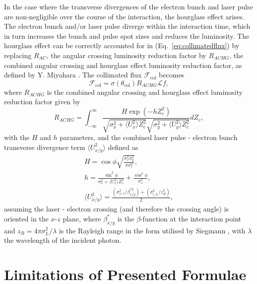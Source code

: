 \documentclass[10pt]{article}
\begin{document}
In the case where the transverse divergences of the electron bunch and laser pulse are non-negligible over the course of the interaction, the hourglass effect arises. The electron bunch and/or laser pulse diverge within the interaction time, which in turn increases the bunch and pulse spot sizes and reduces the luminosity. The hourglass effect can be correctly accounted for in (Eq.~\ref{eq:collimatedflux}) by replacing $R_{AC}$, the angular crossing luminosity reduction factor by $R_{ACHG}$, the combined angular crossing and hourglass effect luminosity reduction factor, as defined by Y. Miyahara \cite{miyahara2008luminosity}. The collimated flux $\mathcal{F}_{\mathrm{col}}$ becomes   
\begin{equation}
\mathcal{F}_{\mathrm{col}} = \sigma\left(\theta_{\mathrm{col}}\right)R_{ACHG}\mathcal{L}f,
\label{eq:collimatedfluxhourglass}
\end{equation}
where $R_{ACHG}$ is the combined angular crossing and hourglass effect luminosity reduction factor given by
\begin{equation}
R_{ACHG} = \int_{-\infty}^{\infty}\frac{H\exp\left(-hZ_{c}^{2}\right)}{\sqrt{\sigma_{x}^{2}+\langle U_{x}^{2}\rangle Z_{c}^{2}} \sqrt{\sigma_{y}^{2}+\langle U_{y}^{2}\rangle Z_{c}^{2}}}dZ_{c},
\label{eq:hourglasseffect}
\end{equation} 
with the $H$ and $h$ parameters, and the combined laser pulse - electron bunch transverse divergence term $\langle U_{x/y}^{2}\rangle$ defined as
\begin{gather}
H = \cos\phi\sqrt{\frac{\sigma_{x}^{2}\sigma_{y}^{2}}{\pi\sigma_{z}^{2}}},
\label{eq:Hmiyahara} \\
h = \frac{\sin^{2}\phi}{\sigma_{x}^{2}+\langle U_{x}^{2}\rangle Z_{c}^{2}}+\frac{\cos^{2}\phi}{\sigma_{z}^{2}},
\label{eq:hmiyahara} \\
\langle U_{x/y}^{2}\rangle = \frac{\left(\sigma_{x,e}^{2}/\beta_{x/y}^{*2}\right)+\left(\sigma_{i,L}^{2}/z_{R}^{2}\right)}{2},
\label{eq:divergence term}
\end{gather}
assuming the laser - electron crossing (and therefore the crossing angle) is oriented in the $x$-$z$ plane, where $\beta^{*}_{x/y}$ is the $\beta$-function at the interaction point and $z_{R} = 4\pi\sigma_{L}^{2}/\lambda$ is the Rayleigh range in the form utilised by Siegmann \cite{siegmann1986lasers}, with $\lambda$ the wavelength of the incident photon. 


\section{Limitations of Presented Formulae}
\end{document}
